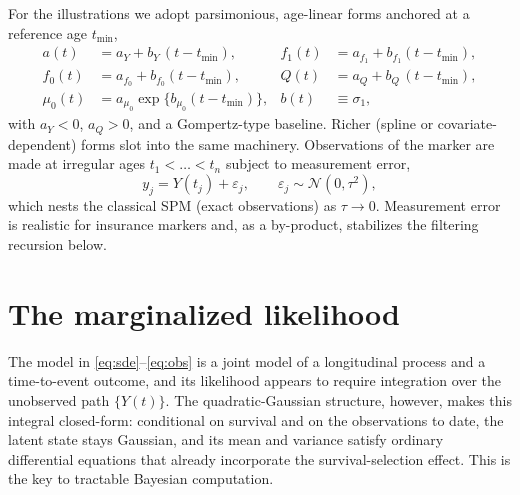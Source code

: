 \documentclass[review,3p,times]{elsarticle}
\newcommand{\fzero}{f_0}
\newcommand{\fone}{f_1}
\begin{document}
For the illustrations we adopt parsimonious, age-linear forms anchored at a
reference age $t_{\min}$,
\begin{equation}\label{eq:components}
\begin{aligned}
  a(t) &= a_Y + b_Y\,(t-t_{\min}), & \fone(t) &= a_{f_1}+b_{f_1}(t-t_{\min}),\\
  \fzero(t) &= a_{f_0}+b_{f_0}(t-t_{\min}), & Q(t) &= a_Q + b_Q\,(t-t_{\min}),\\
  \mu_0(t) &= a_{\mu_0}\exp\!\{b_{\mu_0}(t-t_{\min})\}, & b(t)&\equiv\sigma_1,
\end{aligned}
\end{equation}
with $a_Y<0$, $a_Q>0$, and a Gompertz-type baseline. Richer (spline or
covariate-dependent) forms slot into the same machinery. Observations of the
marker are made at irregular ages $t_1<\dots<t_n$ subject to measurement error,
\begin{equation}\label{eq:obs}
  y_j = Y(t_j) + \varepsilon_j, \qquad \varepsilon_j\sim\mathcal{N}(0,\tau^2),
\end{equation}
which nests the classical SPM (exact observations) as $\tau\to0$. Measurement
error is realistic for insurance markers and, as a by-product, stabilizes the
filtering recursion below.

\section{The marginalized likelihood}\label{sec:lik}

The model in \eqref{eq:sde}--\eqref{eq:obs} is a joint model of a longitudinal
process and a time-to-event outcome, and its likelihood appears to require
integration over the unobserved path $\{Y(t)\}$. The quadratic-Gaussian structure,
however, makes this integral closed-form: conditional on survival and on the
observations to date, the latent state stays Gaussian, and its mean and variance
satisfy ordinary differential equations that already incorporate the
survival-selection effect. This is the key to tractable Bayesian computation.
\end{document}
